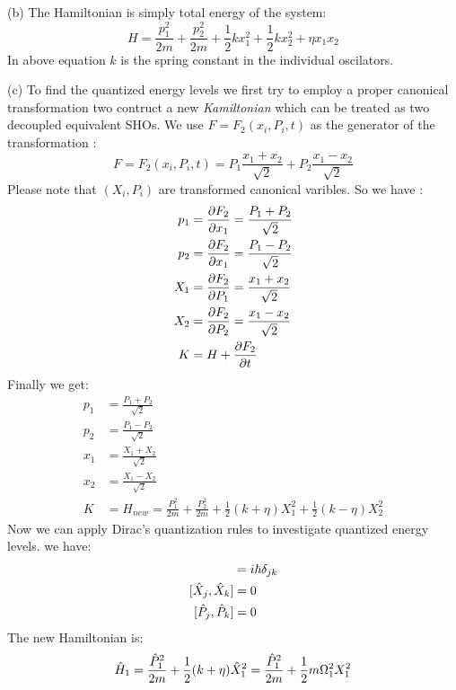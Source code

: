 \begin{homeworkProblem}
\begin{homeworkSection}{(b)}
The Hamiltonian is simply total energy of the system:
\begin{equation}
H=\frac{p_1^2}{2m}+\frac{p_2^2}{2m}+\frac{1}{2}kx_1^2+\frac{1}{2}kx_2^2+\eta x_1x_2
\end{equation}
In above equation $k$ is the spring constant in the individual oscilators.
\end{homeworkSection}
\begin{homeworkSection}{(c)}
To find the quantized energy levels we first try to employ a proper canonical transformation two contruct a new \textit{Kamiltonian} which can be treated as two decoupled equivalent SHOs. We use $F=F_2(x_i,P_i,t)$ as the generator of the transformation \cite{goldstein}:
\begin{equation} 
F=F_2(x_i,P_i,t)=P_1\frac{x_1+x_2}{\sqrt{2}}+P_2\frac{x_1-x_2}{\sqrt{2}}
 \end{equation}
 Please note that $(X_i,P_i)$ are transformed canonical varibles. So we have \cite{goldstein}:
\begin{align}
p_1&=\dfrac{\partial F_2}{\partial x_1}=\frac{P_1+P_2}{\sqrt{2}}\\
p_2&=\dfrac{\partial F_2}{\partial x_1}=\frac{P_1-P_2}{\sqrt{2}}\\
X_1&=\dfrac{\partial F_2}{\partial P_1}=\frac{x_1+x_2}{\sqrt{2}}\\
X_2&=\dfrac{\partial F_2}{\partial P_2}=\frac{x_1-x_2}{\sqrt{2}}\\
K&=H+\dfrac{\partial F_2}{\partial t}
 \end{align}
Finally we get:
\begin{align}
p_1&=\frac{P_1+P_2}{\sqrt{2}}\\
p_2&=\frac{P_1-P_2}{\sqrt{2}}\\
x_1&=\frac{X_1+X_2}{\sqrt{2}}\\
x_2&=\frac{X_1-X_2}{\sqrt{2}}\\
K&=H_{new}=\frac{P_1^2}{2m}+\frac{P_2^2}{2m}+\frac{1}{2}(k+\eta)X_1^2+\frac{1}{2}(k-\eta)X_2^2
\end{align}
Now we can apply Dirac's quantization rules to investigate quantized energy levels. we have:
\begin{align}
[\A{X}_j,\A{P}_k]&=i\hbar\delta_{jk}\\
[\A{X}_j,\A{X}_k]&=0\\
[\A{P}_j,\A{P}_k]&=0\\
\end{align}
The new Hamiltonian is:
\begin{align}
&\A{H}_1=\frac{\A{P}_1^2}{2m}+\frac{1}{2}(k+\eta)\A{X}_1^2=\frac{\A{P}_1^2}{2m}+\frac{1}{2}m\Omega_1^2 X_1^2\\

\end{align}
\end{homeworkSection}
\end{homeworkProblem}
